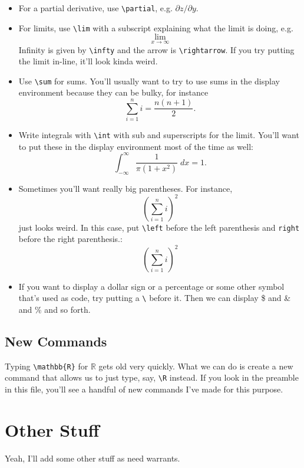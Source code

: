 \documentclass[12pt]{article}
\newcommand{\R}{\mathbb{R}}
\begin{document}
\begin{itemize}
		\item For a partial derivative, use \verb|\partial|, e.g. $\partial z/\partial y$. 
		
		\item For limits, use \verb|\lim| with a subscript explaining what the limit is 
		doing, e.g.
				\[ \lim_{x \rightarrow \infty}  \]
		Infinity is given by \verb|\infty| and  the arrow is \verb|\rightarrow|. If you 
		try putting the limit in-line, it'll look kinda weird. 
		
		\item Use \verb|\sum| for sums. You'll usually want to try to use sums in the 
		display environment because they can be bulky, for instance
			\[\sum_{i=1}^n i = \frac{n(n+1)}{2}.\]
			
		\item Write integrals with \verb|\int| with sub and superscripts for the limit. 
		You'll want to put these in the display environment most of the time as well:
			\[ \int_{-\infty}^{\infty} \frac{1}{\pi(1+x^2)} \; dx = 1 .\]
			
		\item Sometimes you'll want really big parentheses. For instance,
				\[ ( \sum_{i=1}^n i)^2	\]
			just looks weird. In this case, put \verb|\left| before the left parenthesis 
			and \verb|right| before the right parenthesis.:
				\[ \left( \sum_{i=1}^n i \right)^2	\]
				
		\item If you want to display a dollar sign or a percentage or some other symbol 
		that's used as code, try putting a \verb|\| before it. Then we can display \$ and 
		\& and \% and so forth.
	\end{itemize}

	
\subsection{New Commands}
	
	Typing \verb|\mathbb{R}| for $\mathbb{R}$ gets old very quickly. What we can do is 
	create a new command that allows us to just type, say, \verb|\R| instead. If you look 
	in the preamble in this file, you'll see a handful of new commands I've made for this 
	purpose. 
	
	
	
	\section{Other Stuff}
	
	Yeah, I'll add some other stuff as need warrants. 
 
	
\end{document}
